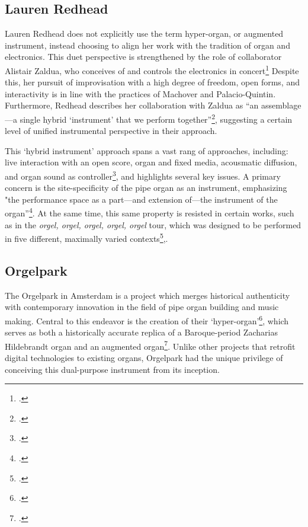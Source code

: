 \documentclass[12pt,twoside,maitrise]{dms_ks}
\theoremstyle{definition}
\begin{document}
{\subsection{Lauren Redhead}

Lauren Redhead does not explicitly use the term hyper-organ, or augmented instrument, instead choosing to align her work with the tradition of organ and electronics. This duet perspective is strengthened by the role of collaborator Alistair Zaldua, who conceives of and controls the electronics in concert\footcite[325]{redhead_organ_2016}
Despite this, her pursuit of improvisation with a high degree of freedom, open forms, and interactivity is in line with the practices of Machover and Palacio-Quintin.
Furthermore, Redhead describes her collaboration with Zaldua as “an assemblage---a single hybrid `instrument' that we perform together”\footcite[342]{redhead_developing_2023}, suggesting a certain level of unified instrumental perspective in their approach.

This `hybrid instrument' approach spans a vast rang of approaches, including: live interaction with an open score, organ and fixed media, acousmatic diffusion, and organ sound as controller\footcite[345]{redhead_developing_2023}, and highlights several key issues.
A primary concern is the site-specificity of the pipe organ as an instrument, emphasizing "the performance space as a part---and extension of---the instrument of the organ”\footcite[3]{redhead_sound_2014}.
At the same time, this same property is resisted in certain works, such as in the \textit{orgel, orgel, orgel, orgel, orgel} tour, which was designed to be performed in five different, maximally varied contexts\footcite[344--345]{redhead_developing_2023},. 

\subsection{Orgelpark}

The Orgelpark in Amsterdam is a project which merges historical authenticity with contemporary innovation in the field of pipe organ building and music making. 
Central to this endeavor is the creation of their `hyper-organ'\footcite{vrije_geluiden_superabundance_2020}, which serves as both a historically accurate replica of a Baroque-period Zacharias Hildebrandt organ and an augmented organ\footcite[36]{peters_how_2014}. 
Unlike other projects that retrofit digital technologies to existing organs, Orgelpark had the unique privilege of conceiving this dual-purpose instrument from its inception. 

}
\end{document}
